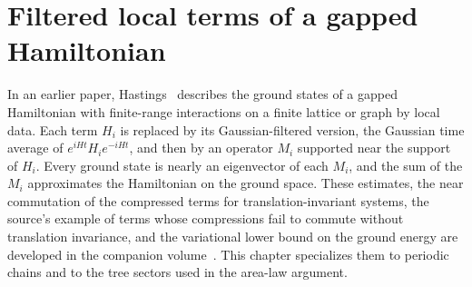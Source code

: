 \chapter{Filtered local terms of a gapped Hamiltonian}
\label{ch:hastings_local_terms}

In an earlier paper, Hastings~\cite{Hastings2006Solving} describes the ground
states of a gapped Hamiltonian with finite-range interactions on a finite
lattice or graph by local data. Each term $H_i$ is replaced by its
Gaussian-filtered version, the Gaussian time average of
$e^{iHt}H_ie^{-iHt}$, and then by an operator $M_i$ supported near the
support of $H_i$. Every ground state is nearly an eigenvector of each $M_i$,
and the sum of the $M_i$ approximates the Hamiltonian on the ground space.
These estimates, the near commutation of the compressed terms for
translation-invariant systems, the source's example of terms whose
compressions fail to commute without translation invariance, and the
variational lower bound on the ground energy are developed in the companion
volume~\cite[``Gaussian-filtered terms of an interaction,''
    ``Low-energy commutators and ground-space bases'' and ``Translations and momentum sectors'']{QICLean2026Blueprint}.
This chapter specializes them to periodic chains and to the tree sectors
used in the area-law argument.



